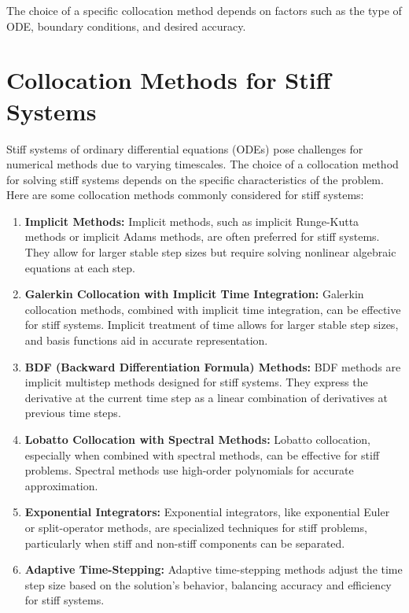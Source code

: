 \documentclass{article}
\begin{document}
The choice of a specific collocation method depends on factors such as the type of ODE, boundary conditions, and desired accuracy.


\section{Collocation Methods for Stiff Systems}

Stiff systems of ordinary differential equations (ODEs) pose challenges for numerical methods due to varying timescales. The choice of a collocation method for solving stiff systems depends on the specific characteristics of the problem. Here are some collocation methods commonly considered for stiff systems:

\begin{enumerate}
    \item \textbf{Implicit Methods:} Implicit methods, such as implicit Runge-Kutta methods or implicit Adams methods, are often preferred for stiff systems. They allow for larger stable step sizes but require solving nonlinear algebraic equations at each step.

    \item \textbf{Galerkin Collocation with Implicit Time Integration:} Galerkin collocation methods, combined with implicit time integration, can be effective for stiff systems. Implicit treatment of time allows for larger stable step sizes, and basis functions aid in accurate representation.

    \item \textbf{BDF (Backward Differentiation Formula) Methods:} BDF methods are implicit multistep methods designed for stiff systems. They express the derivative at the current time step as a linear combination of derivatives at previous time steps.

    \item \textbf{Lobatto Collocation with Spectral Methods:} Lobatto collocation, especially when combined with spectral methods, can be effective for stiff problems. Spectral methods use high-order polynomials for accurate approximation.

    \item \textbf{Exponential Integrators:} Exponential integrators, like exponential Euler or split-operator methods, are specialized techniques for stiff problems, particularly when stiff and non-stiff components can be separated.

    \item \textbf{Adaptive Time-Stepping:} Adaptive time-stepping methods adjust the time step size based on the solution's behavior, balancing accuracy and efficiency for stiff systems.
\end{enumerate}
\end{document}
